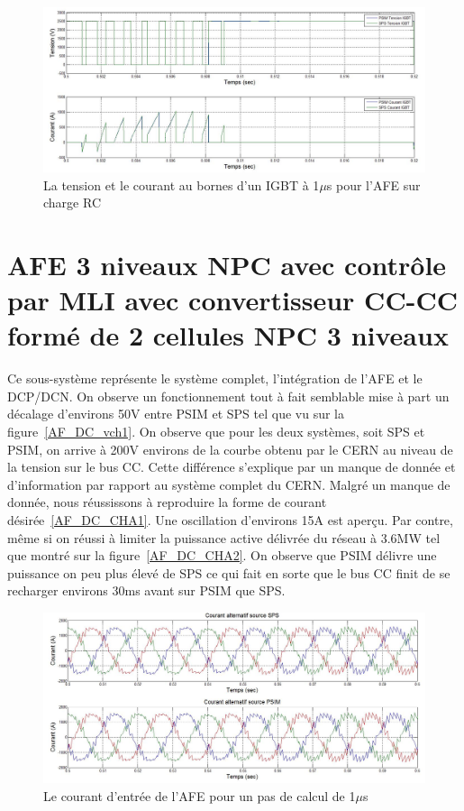 \begin{figure}[htb]
\centering
\includegraphics[scale=0.5]{fig/com_afe.jpg}
\caption{La tension et le courant au bornes d'un IGBT à 1$\mu$s pour l'AFE sur charge RC}
\label{AF_RC_igbt}
\end{figure}

\clearpage
\section{AFE 3 niveaux NPC avec contrôle par MLI avec convertisseur CC-CC formé de 2 cellules NPC 3 niveaux}
Ce sous-système représente le système complet, l'intégration de l'AFE et le DCP/DCN. On observe un fonctionnement tout à fait semblable mise à part un décalage d'environs 50V entre PSIM et SPS tel que vu sur la figure~\ref{AF_DC_vch1}. On observe que pour les deux systèmes, soit SPS et PSIM, on arrive à 200V environs de la courbe obtenu par le CERN au niveau de la tension sur le bus CC. Cette différence s'explique par un manque de donnée et d'information par rapport au système complet du CERN. Malgré un manque de donnée, nous réussissons à reproduire la forme de courant désirée~\ref{AF_DC_CHA1}. Une oscillation d'environs 15A est aperçu. Par contre, même si on réussi à limiter la puissance active délivrée du réseau à 3.6MW tel que montré sur la figure~\ref{AF_DC_CHA2}. On observe que PSIM délivre une puissance on peu plus élevé de SPS ce qui fait en sorte que le bus CC finit de se recharger environs 30ms avant sur PSIM que SPS.


\begin{figure}[htb]
\centering
\includegraphics[scale=0.5]{fig/DCP_AFE/1u/cour_al.jpg}
\caption{Le courant d'entrée de l'AFE pour un pas de calcul de 1$\mu$s}
\label{AF_DC_cou1}
\end{figure}


